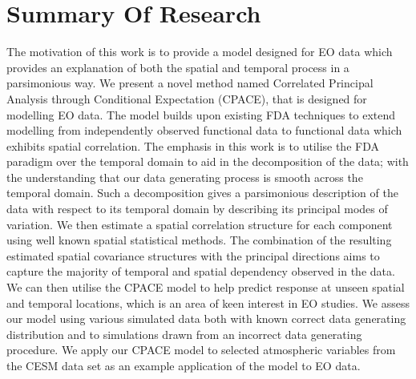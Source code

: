 \section{\label{sec:summary_research}Summary Of Research}
The motivation of this work is to provide a model designed for EO data which provides an explanation of both the spatial and temporal process in a parsimonious way.
We present a novel method named Correlated Principal Analysis through Conditional Expectation (CPACE), that is designed for modelling EO data.
The model builds upon existing FDA techniques to extend modelling from independently observed functional data to functional data which exhibits spatial correlation.
The emphasis in this work is to utilise the FDA paradigm over the temporal domain to aid in the decomposition of the data; with the understanding that our data generating process is smooth across the temporal domain.
Such a decomposition gives a parsimonious description of the data with respect to its temporal domain by describing its principal modes of variation.
We then estimate a spatial correlation structure for each component using well known spatial statistical methods.
The combination of the resulting estimated spatial covariance structures with the principal directions aims to capture the majority of temporal and spatial dependency observed in the data.
We can then utilise the CPACE model to help predict response at unseen spatial and temporal locations, which is an area of keen interest in EO studies.
We assess our model using various simulated data both with known correct data generating distribution and to simulations drawn from an incorrect data generating procedure.
We apply our CPACE model to selected atmospheric variables from the CESM data set as an example application of the model to EO data.

